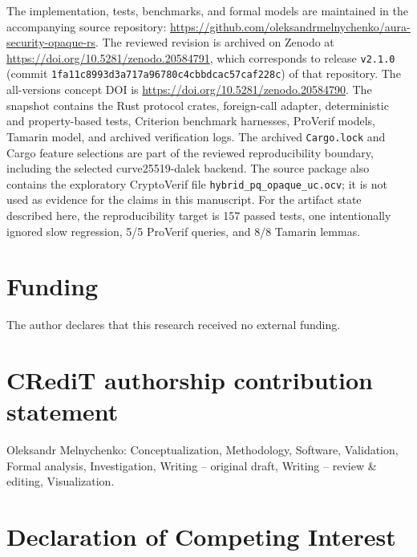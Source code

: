 \documentclass[preprint,12pt]{elsarticle}
\newcommand{\codeid}[1]{\textsf{#1}}
\theoremstyle{remark}
\begin{document}
The implementation, tests, benchmarks, and formal models are maintained
in the accompanying source repository:
\url{https://github.com/oleksandrmelnychenko/aura-security-opaque-rs}.
The reviewed revision is archived on Zenodo at
\url{https://doi.org/10.5281/zenodo.20584791}, which corresponds to release
\texttt{v2.1.0} (commit \texttt{1fa11c8993d3a\allowbreak{}717a96780c4cb\allowbreak{}bdcac57caf228c}) of that repository. The all-versions
concept DOI is \url{https://doi.org/10.5281/zenodo.20584790}. The snapshot contains the Rust
protocol crates, foreign-call adapter, deterministic and
property-based tests, Criterion benchmark harnesses, ProVerif models,
Tamarin model, and archived verification logs. The archived
\texttt{Cargo.lock} and Cargo feature selections are part of the reviewed
reproducibility boundary, including the selected \codeid{curve25519-dalek}
backend. The source package also contains the exploratory CryptoVerif file
\texttt{hybrid\_pq\_opaque\_uc.ocv}; it is not used as evidence for the
claims in this manuscript. For the artifact state described here, the
reproducibility target is 157 passed tests, one intentionally ignored slow
regression, 5/5 ProVerif queries, and 8/8 Tamarin lemmas.

\section*{Funding}

The author declares that this research received no external funding.

\section*{CRediT authorship contribution statement}

Oleksandr Melnychenko: Conceptualization, Methodology, Software,
Validation, Formal analysis, Investigation, Writing -- original draft,
Writing -- review \& editing, Visualization.

\section*{Declaration of Competing Interest}
\end{document}
